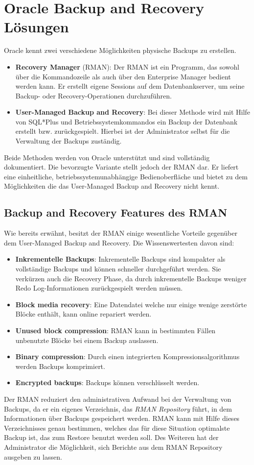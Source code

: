     \section{Oracle Backup and Recovery Lösungen}
      Oracle kennt zwei verschiedene Möglichkeiten physische Backups zu erstellen.
      \begin{itemize}
        \item \textbf{Recovery Manager} (RMAN): Der RMAN ist ein Programm, das sowohl über die Kommandozeile als auch über den Enterprise Manager bedient werden kann. Er erstellt eigene Sessions auf dem Datenbankserver, um seine Backup- oder Recovery-Operationen durchzuführen.

        \item \textbf{User-Managed Backup and Recovery}: Bei dieser Methode wird mit Hilfe von SQL*Plus und Betriebssystemkommandos ein Backup der Datenbank erstellt bzw. zurückgespielt. Hierbei ist der Administrator selbst für die Verwaltung der Backups zuständig.
      \end{itemize}
      Beide Methoden werden von Oracle unterstützt und sind vollständig dokumentiert. Die bevorzugte Variante stellt jedoch der RMAN dar. Er liefert eine einheitliche, betriebssystemunabhängige Bedienoberfläche und bietet zu dem Möglichkeiten die das User-Managed Backup and Recovery nicht kennt.
      \subsection{Backup and Recovery Features des RMAN}
        Wie bereits erwähnt, besitzt der RMAN einige wesentliche Vorteile gegenüber dem User-Managed Backup and Recovery. Die Wissenswertesten davon sind:
        \begin{itemize}
          \item \textbf{Inkrementelle Backups}: Inkrementelle Backups sind kompakter als vollständige Backups und können schneller durchgeführt werden. Sie verkürzen auch die Recovery Phase, da durch inkrementelle Backups weniger Redo Log-Informationen zurückgespielt werden müssen.
          \item \textbf{Block media recovery}: Eine Datendatei welche nur einige wenige zerstörte Blöcke enthält, kann online repariert werden.
          \item \textbf{Unused block compression}: RMAN kann in bestimmten Fällen unbenutzte Blöcke bei einem Backup auslassen.
          \item \textbf{Binary compression}: Durch einen integrierten Kompressionsalgorithmus werden Backups komprimiert.
          \item \textbf{Encrypted backups}: Backups können verschlüsselt werden.
        \end{itemize}
        Der RMAN reduziert den administrativen Aufwand bei der Verwaltung von
        Backups, da er ein eigenes Verzeichnis, das \textit{RMAN Repository}
        führt, in dem  Informationen über Backups gespeichert werden. RMAN
        kann mit Hilfe dieses Verzeichnisses genau bestimmen, welches das für
        diese Situation optimalste Backup ist, das zum Restore benutzt werden
        soll. Des Weiteren hat der Administrator die Möglichkeit, sich
        Berichte aus dem RMAN Repository ausgeben zu lassen.

